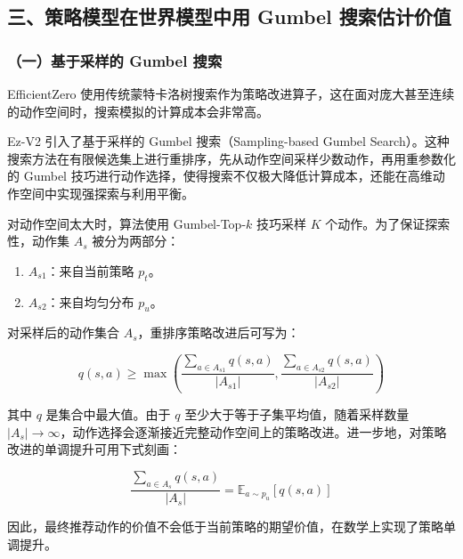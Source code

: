 \hypertarget{ux4e09ux7b56ux7565ux6a21ux578bux5728ux4e16ux754cux6a21ux578bux4e2dux7528-gumbel-ux641cux7d22ux4f30ux8ba1ux4ef7ux503c}{%
\subsection{三、策略模型在世界模型中用 Gumbel 搜索估计价值}\label{ux4e09ux7b56ux7565ux6a21ux578bux5728ux4e16ux754cux6a21ux578bux4e2dux7528-gumbel-ux641cux7d22ux4f30ux8ba1ux4ef7ux503c}}

\hypertarget{ux4e00ux57faux4e8eux91c7ux6837ux7684-gumbel-ux641cux7d22}{%
\subsubsection{（一）基于采样的 Gumbel 搜索}\label{ux4e00ux57faux4e8eux91c7ux6837ux7684-gumbel-ux641cux7d22}}

EfficientZero 使用传统蒙特卡洛树搜索作为策略改进算子，这在面对庞大甚至连续的动作空间时，搜索模拟的计算成本会非常高。

Ez-V2 引入了基于采样的 Gumbel 搜索（Sampling-based Gumbel Search）。这种搜索方法在有限候选集上进行重排序，先从动作空间采样少数动作，再用重参数化的 Gumbel 技巧进行动作选择，使得搜索不仅极大降低计算成本，还能在高维动作空间中实现强探索与利用平衡。

对动作空间太大时，算法使用 Gumbel-Top-\(k\) 技巧采样 \(K\) 个动作。为了保证探索性，动作集 \(A_s\) 被分为两部分：

\begin{enumerate}
\def\labelenumi{\arabic{enumi}.}
\tightlist
\item
  \(A_{s1}\)：来自当前策略 \(p_t\)。
\item
  \(A_{s2}\)：来自均匀分布 \(p_u\)。
\end{enumerate}

对采样后的动作集合 \(A_s\)，重排序策略改进后可写为：

\[
q(s, a)
\ge
\max\left(
\frac{\sum_{a \in A_{s1}} q(s, a)}{|A_{s1}|},
\frac{\sum_{a \in A_{s2}} q(s, a)}{|A_{s2}|}
\right)
\]

其中 \(q\) 是集合中最大值。由于 \(q\) 至少大于等于子集平均值，随着采样数量 \(|A_s| \to \infty\)，动作选择会逐渐接近完整动作空间上的策略改进。进一步地，对策略改进的单调提升可用下式刻画：

\[
\frac{\sum_{a \in A_s} q(s, a)}{|A_s|}
= \mathbb{E}_{a \sim p_u}\left[q(s, a)\right]
\]

因此，最终推荐动作的价值不会低于当前策略的期望价值，在数学上实现了策略单调提升。

